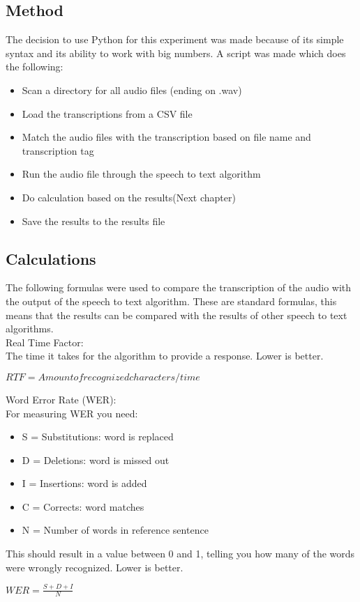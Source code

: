 \documentclass{article}
\begin{document}
\subsection{Method}
The decision to use Python for this experiment was made because of its simple syntax and its ability to work with big numbers. A script was made which does the following:
\begin{itemize}
    \item Scan a directory for all audio files (ending on .wav)
    \item Load the transcriptions from a CSV file
    \item Match the audio files with the transcription based on file name and transcription tag
    \item Run the audio file through the speech to text algorithm
    \item Do calculation based on the results(Next chapter)
    \item Save the results to the results file
\end{itemize}

\subsection{Calculations}
The following formulas were used to compare the transcription of the audio with the output of the speech to text algorithm. These are standard formulas, this means that the results can be compared with the results of other speech to text algorithms. \\

    Real Time Factor: \\
    The time it takes for the algorithm to provide a response. Lower is better.
    \begin{center}
    $ RTF = Amount of recognized characters / time$ \\
    \end{center} 

    Word Error Rate (WER): \\
    For measuring WER you need:
    \begin{itemize}
        \item S = Substitutions:  word is replaced
        \item D = Deletions:  word is missed out
        \item I = Insertions:  word is added
        \item C = Corrects:  word matches
        \item N = Number of words in reference sentence
    \end{itemize}
    This should result in a value between 0 and 1, telling you how many of the words were wrongly recognized. Lower is better.
    \begin{center}
    $ WER = \frac{S + D + I}{N}$ \\
    \end{center} 
    
\end{document}
